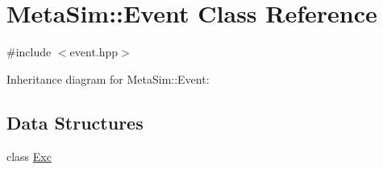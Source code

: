 \hypertarget{classMetaSim_1_1Event}{}\section{Meta\+Sim\+:\+:Event Class Reference}
\label{classMetaSim_1_1Event}


{\ttfamily \#include $<$event.\+hpp$>$}



Inheritance diagram for Meta\+Sim\+:\+:Event\+:
\subsection*{Data Structures}
\begin{DoxyCompactItemize}
\item 
class \hyperlink{classMetaSim_1_1Event_1_1Exc}{Exc}
\end{DoxyCompactItemize}
